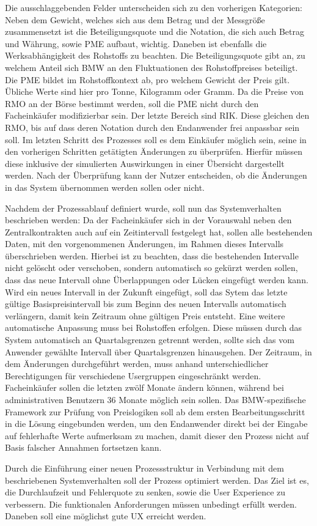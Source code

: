 Die ausschlaggebenden Felder unterscheiden sich zu den vorherigen Kategorien: Neben dem Gewicht, welches sich aus dem Betrag und der Messgrö\ss e zusammensetzt ist die Beteiligungsquote und die Notation, die sich auch Betrag und Währung, sowie PME aufbaut, wichtig. Daneben ist ebenfalls die Werksabhängigkeit des Rohstoffs zu beachten. Die Beteiligungsquote gibt an, zu welchem Anteil sich BMW an den Fluktuationen des Rohstoffpreises beteiligt. Die PME bildet im Rohstoffkontext ab, pro welchem Gewicht der Preis gilt. Übliche Werte sind hier pro Tonne, Kilogramm oder Gramm. Da die Preise von RMO an der Börse bestimmt werden, soll die PME nicht durch den Facheinkäufer modifizierbar sein. Der letzte Bereich sind RIK. Diese gleichen den RMO, bis auf dass deren Notation durch den Endanwender frei anpassbar sein soll. Im letzten Schritt des Prozesses soll es dem Einkäufer möglich sein, seine in den vorherigen Schritten getätigten Änderungen zu überprüfen. Hierfür müssen diese inklusive der simulierten Auswirkungen in einer Übersicht dargestellt werden. Nach der Überprüfung kann der Nutzer entscheiden, ob die Änderungen in das System übernommen werden sollen oder nicht.

Nachdem der Prozessablauf definiert wurde, soll nun das Systemverhalten beschrieben werden: Da der Facheinkäufer sich in der Vorauswahl neben den Zentralkontrakten auch auf ein Zeitintervall festgelegt hat, sollen alle bestehenden Daten, mit den vorgenommenen Änderungen, im Rahmen dieses Intervalls überschrieben werden. Hierbei ist zu beachten, dass die bestehenden Intervalle nicht gelöscht oder verschoben, sondern automatisch so gekürzt werden sollen, dass das neue Intervall ohne Überlappungen oder Lücken eingefügt werden kann. Wird ein neues Intervall in der Zukunft eingefügt, soll das Sytem das letzte gültige Basispreisintervall bis zum Beginn des neuen Intervalls automatisch verlängern, damit kein Zeitraum ohne gültigen Preis entsteht. Eine weitere automatische Anpassung muss bei Rohstoffen erfolgen. Diese müssen durch das System automatisch an Quartalsgrenzen getrennt werden, sollte sich das vom Anwender gewählte Intervall über Quartalsgrenzen hinausgehen. Der Zeitraum, in dem Änderungen durchgeführt werden, muss anhand unterschiedlicher Berechtigungen für verschiedene Usergruppen eingeschränkt werden. Facheinkäufer sollen die letzten zwölf Monate ändern können, während bei administrativen Benutzern 36 Monate möglich sein sollen. Das BMW-spezifische Framework zur Prüfung von Preislogiken soll ab dem ersten Bearbeitungsschritt in die Lösung eingebunden werden, um den Endanwender direkt bei der Eingabe auf fehlerhafte Werte aufmerksam zu machen, damit dieser den Prozess nicht auf Basis falscher Annahmen fortsetzen kann.

Durch die Einführung einer neuen Prozessstruktur in Verbindung mit dem beschriebenen Systemverhalten soll der Prozess optimiert werden. Das Ziel ist es, die Durchlaufzeit und Fehlerquote zu senken, sowie die User Experience zu verbessern. Die funktionalen Anforderungen müssen unbedingt erfüllt werden. Daneben soll eine möglichst gute UX erreicht werden.